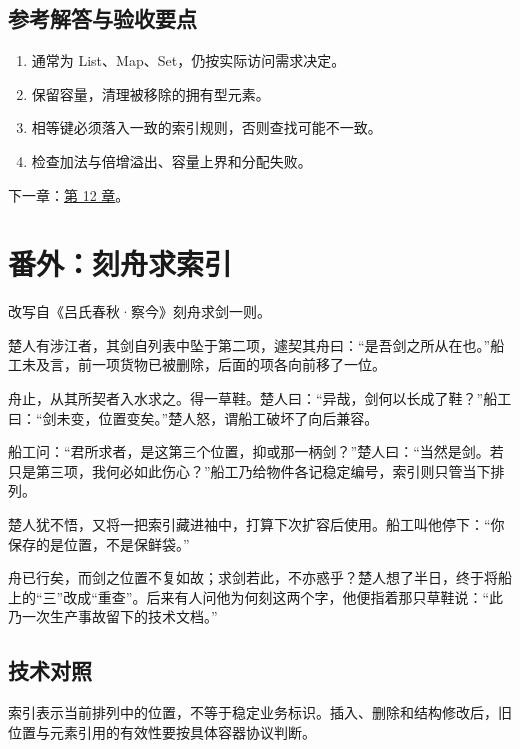 \subsection*{参考解答与验收要点}

\begin{enumerate}

\item 通常为 List、Map、Set，仍按实际访问需求决定。

\item 保留容量，清理被移除的拥有型元素。

\item 相等键必须落入一致的索引规则，否则查找可能不一致。

\item 检查加法与倍增溢出、容量上界和分配失败。

\end{enumerate}

下一章：\hyperref[ch:12]{第 12 章}。

\section{番外：刻舟求索引}

改写自《吕氏春秋·察今》刻舟求剑一则。

楚人有涉江者，其剑自列表中坠于第二项，遽契其舟曰：“是吾剑之所从在也。”船工未及言，前一项货物已被删除，后面的项各向前移了一位。

舟止，从其所契者入水求之。得一草鞋。楚人曰：“异哉，剑何以长成了鞋？”船工曰：“剑未变，位置变矣。”楚人怒，谓船工破坏了向后兼容。

船工问：“君所求者，是这第三个位置，抑或那一柄剑？”楚人曰：“当然是剑。若只是第三项，我何必如此伤心？”船工乃给物件各记稳定编号，索引则只管当下排列。

楚人犹不悟，又将一把索引藏进袖中，打算下次扩容后使用。船工叫他停下：“你保存的是位置，不是保鲜袋。”

舟已行矣，而剑之位置不复如故；求剑若此，不亦惑乎？楚人想了半日，终于将船上的“三”改成“重查”。后来有人问他为何刻这两个字，他便指着那只草鞋说：“此乃一次生产事故留下的技术文档。”

\subsection*{技术对照}

索引表示当前排列中的位置，不等于稳定业务标识。插入、删除和结构修改后，旧位置与元素引用的有效性要按具体容器协议判断。
